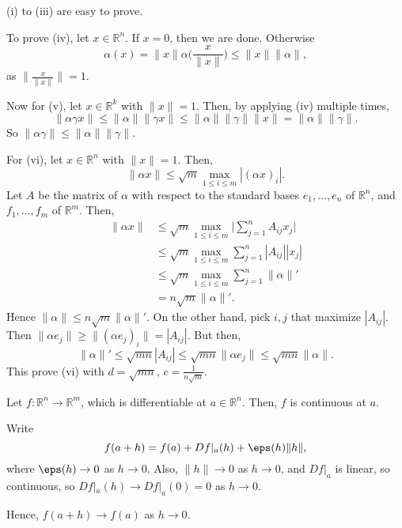 \documentclass[12pt]{article}
\begin{document}
\begin{proofbox}
	(i) to (iii) are easy to prove.

	To prove (iv), let $x \in \mathbb{R}^{n}$. If $x = 0$, then we are done. Otherwise
	\[
	\alpha(x) = \|x\| \alpha \biggl( \frac{x}{\|x\|}\biggr) \leq \|x\| \|\alpha\|
	,\]
	as $\| \frac{x}{\|x\|} \| = 1$.

	Now for (v), let $x \in \mathbb{R}^{k}$ with $\|x\| = 1$. Then, by applying (iv) multiple times,
	\[
	\|\alpha \gamma x\| \leq \|\alpha\| \|\gamma x\| \leq \|\alpha \| \|\gamma \| \|x\| = \|\alpha\|\|\gamma\|
	.\]
	So $\|\alpha \gamma \| \leq \|\alpha \| \|\gamma\|$.

	For (vi), let $x \in \mathbb{R}^{n}$ with $\|x\| = 1$. Then,
	\[
	\|\alpha x\| \leq \sqrt m \max_{1 \leq i \leq m} | (\alpha x)_{i} |
	.\]
	Let $A$ be the matrix of $\alpha$ with respect to the standard bases $e_1, \ldots, e_n$ of $\mathbb{R}^{n}$, and $f_1, \ldots, f_m$ of $\mathbb{R}^{m}$. Then,
	\begin{align*}
	\|\alpha x\| &\leq \sqrt m \max_{1 \leq i \leq m} \biggl| \sum_{j = 1}^{n} A_{ij} x_j \biggr| \\
		     &\leq \sqrt m \max_{1 \leq i \leq m} \sum_{j = 1}^{n} |A_{ij}| |x_j| \\
		     &\leq \sqrt m \max_{1 \leq i \leq m} \sum_{j = 1}^{n} \|\alpha\|' \\
		     &= n \sqrt m \|\alpha\|'.
	\end{align*}
	Hence $\|\alpha\| \leq n \sqrt m \|\alpha\|'$. On the other hand, pick $i, j$ that maximize $|A_{ij}|$. Then $\|\alpha e_j\| \geq \|(\alpha e_j)_i\| = |A_{ij}|$. But then,
	\[
		\|\alpha\|' \leq \sqrt{mn} |A_{ij}| \leq \sqrt{mn} \|\alpha e_j\| \leq \sqrt{mn} \|\alpha\|
	.\]
	This prove (vi) with $d = \sqrt{mn}$, $c = \frac{1}{n\sqrt m}$.
\end{proofbox}

\begin{proposition}
	Let $f : \mathbb{R}^{n} \to \mathbb{R}^{m}$, which is differentiable at $a \in \mathbb{R}^{n}$. Then, $f$ is continuous at $a$.
\end{proposition}

\begin{proofbox}
	Write
	\[
	f(a + h) = f(a) + Df|_{a}(h) + \eps(h) \|h\|
	,\]
	where $\eps(h) \to 0$ as $h \to 0$. Also, $\|h\| \to 0$ as $h \to 0$, and $Df|_{a}$ is linear, so continuous, so $Df|_{a}(h) \to Df|_{a}(0) = 0$ as $h \to 0$.

	Hence, $f(a + h) \to f(a)$ as $h \to 0$.
\end{proofbox}
\end{document}
